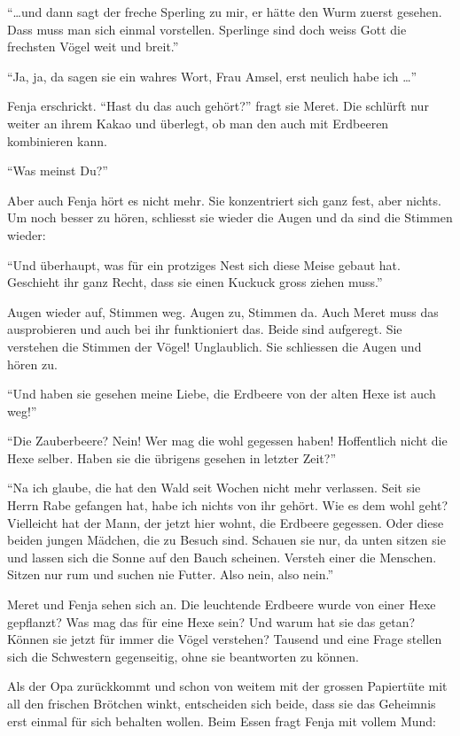 \enquote{\dots und dann sagt der freche Sperling zu mir, er hätte den Wurm zuerst gesehen. Dass muss man sich einmal vorstellen. Sperlinge sind doch weiss Gott die frechsten Vögel weit und breit.}

\enquote{Ja, ja, da sagen sie ein wahres Wort, Frau Amsel, erst neulich habe ich \dots}

Fenja erschrickt. \enquote{Hast du das auch gehört?} fragt sie Meret. Die schlürft nur weiter an ihrem Kakao und überlegt, ob man den auch mit Erdbeeren kombinieren kann.

\enquote{Was meinst Du?}

Aber auch Fenja hört es nicht mehr. Sie konzentriert sich ganz fest, aber nichts. Um noch besser zu hören, schliesst sie wieder die Augen und da sind die Stimmen wieder:

\enquote{Und überhaupt, was für ein protziges Nest sich diese Meise gebaut hat. Geschieht ihr ganz Recht, dass sie einen Kuckuck gross ziehen muss.}  

Augen wieder auf, Stimmen weg. Augen zu, Stimmen da. Auch Meret muss das ausprobieren und auch bei ihr funktioniert das. Beide sind aufgeregt. Sie verstehen die Stimmen der Vögel! Unglaublich. Sie schliessen die Augen und hören zu.

\enquote{Und haben sie gesehen meine Liebe, die Erdbeere von der alten Hexe ist auch weg!}

\enquote{Die Zauberbeere? Nein! Wer mag die wohl gegessen haben! Hoffentlich nicht die Hexe selber. Haben sie die übrigens gesehen in letzter Zeit?}

\enquote{Na ich glaube, die hat den Wald seit Wochen nicht mehr verlassen. Seit sie Herrn Rabe gefangen hat, habe ich nichts von ihr gehört. Wie es dem wohl geht? Vielleicht hat der Mann, der jetzt hier wohnt, die Erdbeere gegessen. Oder diese beiden jungen Mädchen, die zu Besuch sind. Schauen sie nur, da unten sitzen sie und lassen sich die Sonne auf den Bauch scheinen. Versteh einer die Menschen. Sitzen nur rum und suchen nie Futter. Also nein, also nein.}

Meret und Fenja sehen sich an. Die leuchtende Erdbeere wurde von einer Hexe gepflanzt? Was mag das für eine Hexe sein? Und warum hat sie das getan? Können sie jetzt für immer die Vögel verstehen? Tausend und eine Frage stellen sich die Schwestern gegenseitig, ohne sie beantworten zu können.

Als der Opa zurückkommt und schon von weitem mit der grossen Papiertüte mit all den frischen Brötchen winkt, entscheiden sich beide, dass sie das Geheimnis erst einmal für sich behalten wollen. Beim Essen fragt Fenja mit vollem Mund:

